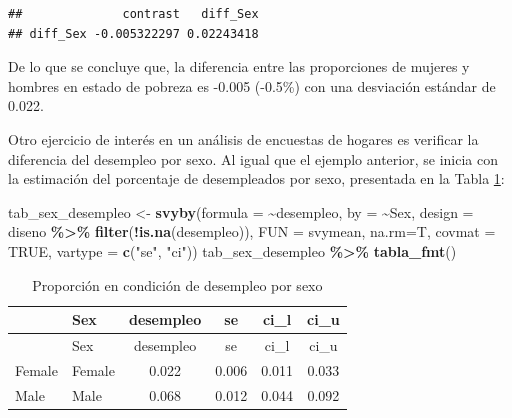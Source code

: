 \documentclass[
  spanish,
  12pt,
]{book}
\newenvironment{Shaded}{\begin{snugshade}}{\end{snugshade}}
\newcommand{\AttributeTok}[1]{\textcolor[rgb]{0.13,0.29,0.53}{#1}}
\newcommand{\ConstantTok}[1]{\textcolor[rgb]{0.56,0.35,0.01}{#1}}
\newcommand{\FunctionTok}[1]{\textcolor[rgb]{0.13,0.29,0.53}{\textbf{#1}}}
\newcommand{\NormalTok}[1]{#1}
\newcommand{\OtherTok}[1]{\textcolor[rgb]{0.56,0.35,0.01}{#1}}
\newcommand{\SpecialCharTok}[1]{\textcolor[rgb]{0.81,0.36,0.00}{\textbf{#1}}}
\newcommand{\StringTok}[1]{\textcolor[rgb]{0.31,0.60,0.02}{#1}}
\begin{document}
\begin{verbatim}
##              contrast   diff_Sex
## diff_Sex -0.005322297 0.02243418
\end{verbatim}

De lo que se concluye que, la diferencia entre las proporciones de mujeres y hombres en estado de pobreza es -0.005 (-0.5\%) con una desviación estándar de 0.022.

Otro ejercicio de interés en un análisis de encuestas de hogares es verificar la diferencia del desempleo por sexo. Al igual que el ejemplo anterior, se inicia con la estimación del porcentaje de desempleados por sexo, presentada en la Tabla \ref{tab:tab-svyby-desempleo-sexo}:

\begin{Shaded}
\begin{Highlighting}[]
\NormalTok{tab\_sex\_desempleo }\OtherTok{\textless{}{-}} \FunctionTok{svyby}\NormalTok{(}\AttributeTok{formula =} \SpecialCharTok{\textasciitilde{}}\NormalTok{desempleo, }\AttributeTok{by =} \SpecialCharTok{\textasciitilde{}}\NormalTok{Sex,}
                           \AttributeTok{design  =}\NormalTok{ diseno }\SpecialCharTok{\%\textgreater{}\%} \FunctionTok{filter}\NormalTok{(}\SpecialCharTok{!}\FunctionTok{is.na}\NormalTok{(desempleo)),}
                           \AttributeTok{FUN     =}\NormalTok{ svymean, }\AttributeTok{na.rm=}\NormalTok{T, }\AttributeTok{covmat =} \ConstantTok{TRUE}\NormalTok{,}
                           \AttributeTok{vartype =} \FunctionTok{c}\NormalTok{(}\StringTok{"se"}\NormalTok{, }\StringTok{"ci"}\NormalTok{))}
\NormalTok{tab\_sex\_desempleo }\SpecialCharTok{\%\textgreater{}\%}
  \FunctionTok{tabla\_fmt}\NormalTok{()}
\end{Highlighting}
\end{Shaded}

\begin{longtable}[]{@{}llcccc@{}}
\caption{\label{tab:tab-svyby-desempleo-sexo}Proporción en condición de desempleo por sexo}\tabularnewline
\toprule\noalign{}
& Sex & desempleo & se & ci\_l & ci\_u \\
\midrule\noalign{}
\endfirsthead
\toprule\noalign{}
& Sex & desempleo & se & ci\_l & ci\_u \\
\midrule\noalign{}
\endhead
\bottomrule\noalign{}
\endlastfoot
Female & Female & 0.022 & 0.006 & 0.011 & 0.033 \\
Male & Male & 0.068 & 0.012 & 0.044 & 0.092 \\
\end{longtable}
\end{document}
